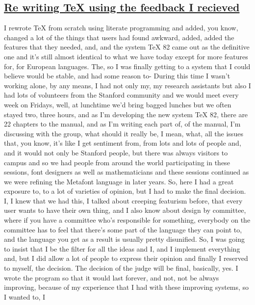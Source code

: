 \documentclass[]{article}
\begin{document}
\subsection{\texorpdfstring{\href{http://webofstories.com/play/17126}{Re
writing TeX using the feedback I
recieved}}{Re writing TeX using the feedback I recieved}}\label{re-writing-tex-using-the-feedback-i-recieved}

I rewrote TeX from scratch using literate programming and added, you
know, changed a lot of the things that users had found awkward, added,
added the features that they needed, and, and the system TeX 82 came out
as the definitive one and it's still almost identical to what we have
today except for more features for, for European languages. The, so I
was finally getting to a system that I could believe would be stable,
and had some reason to- During this time I wasn't working alone, by any
means, I had not only my, my research assistants but also I had lots of
volunteers from the Stanford community and we would meet every week on
Fridays, well, at lunchtime we'd bring bagged lunches but we often
stayed two, three hours, and as I'm developing the new system TeX 82,
there are 22 chapters to the manual, and as I'm writing each part of, of
the manual, I'm discussing with the group, what should it really be, I
mean, what, all the issues that, you know, it's like I get sentiment
from, from lots and lots of people and, and it would not only be
Stanford people, but there was always visitors to campus and so we had
people from around the world participating in these sessions, font
designers as well as mathematicians and these sessions continued as we
were refining the Metafont language in later years. So, here I had a
great exposure to, to a lot of varieties of opinion, but I had to make
the final decision. I, I knew that we had this, I talked about creeping
featurism before, that every user wants to have their own thing, and I
also know about design by committee, where if you have a committee who's
responsible for something, everybody on the committee has to feel that
there's some part of the language they can point to, and the language
you get as a result is usually pretty disunified. So, I was going to
insist that I be the filter for all the ideas and I, and I implement
everything and, but I did allow a lot of people to express their opinion
and finally I reserved to myself, the decision. The decision of the
judge will be final, basically, yes. I wrote the program so that it
would last forever, and not, not be always improving, because of my
experience that I had with these improving systems, so I wanted to, I
\end{document}
